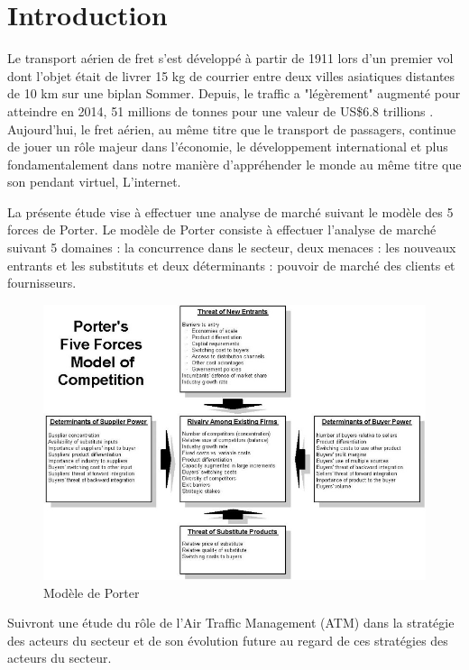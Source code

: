 
\pagebreak

\section*{Introduction}

Le transport aérien de fret s'est développé à partir de 1911 lors d'un
premier vol dont l'objet était de livrer 15 kg de courrier entre deux villes asiatiques distantes de 10 km sur une biplan Sommer. Depuis, le traffic a "légèrement" augmenté pour atteindre en 2014, 51 millions de tonnes pour une valeur de US\$6.8 trillions \cite{RePEc:eee:jaitra:v:61:y:2017:i:c:p:34-40}.
Aujourd'hui, le fret aérien, au même titre que le transport de passagers, continue de jouer un rôle majeur dans l'économie, le développement international et plus fondamentalement dans notre manière d'appréhender le monde au même titre que son pendant virtuel, L'internet. 

 
La présente étude vise à effectuer une analyse de marché suivant le modèle des 5 forces de Porter.
Le modèle de Porter consiste à effectuer l'analyse de marché suivant 5 domaines :
la concurrence dans le secteur, deux menaces : les nouveaux entrants et les substituts et deux déterminants : pouvoir de marché des clients et fournisseurs.

\begin{figure}[H]
	\begin{center}
		\includegraphics[scale=0.48]{images/porter/porter_1}
		\caption{Modèle de Porter}
		\label{inclusion}
	\end{center}
\end{figure}


Suivront une étude du rôle de l'Air Traffic Management (ATM) dans la stratégie des acteurs du secteur et de son évolution future au regard de ces stratégies des acteurs du secteur. 
   



